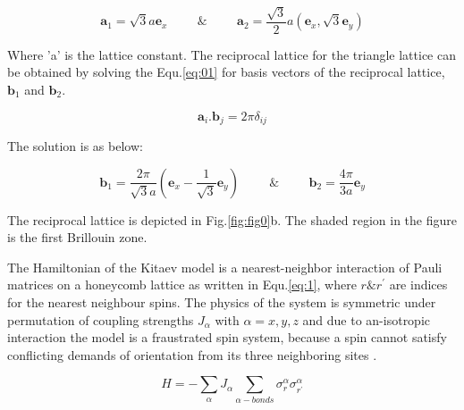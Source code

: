 \documentclass{article}
\begin{document}
\begin{equation}\label{eq:0}
    \textbf{a}_1 = \sqrt{3} a \textbf{e}_x \hspace{1cm} \& \hspace{1cm}
    \textbf{a}_2 = \frac{\sqrt{3}}{2} a (\textbf{e}_x, \sqrt{3}\textbf{e}_y)
\end{equation}

Where 'a' is the lattice constant. The reciprocal lattice for the triangle lattice can be obtained by solving the Equ.\hspace{0.2mm}\ref{eq:01} for basis vectors of the reciprocal lattice, $\textbf{b}_1$ and $\textbf{b}_2$.

\begin{equation}\label{eq:01}
    \textbf{a}_i.\textbf{b}_j = 2\pi\delta_{ij}
\end{equation}

The solution is as below:

\begin{equation}\label{eq:02}
    \textbf{b}_1 = \frac{2\pi}{\sqrt{3}a} (\textbf{e}_x-\frac{1}{\sqrt{3}}\textbf{e}_y) \hspace{1cm} \& \hspace{1cm}
    \textbf{b}_2 = \frac{4\pi}{3a} \textbf{e}_y
\end{equation}

The reciprocal lattice is depicted in Fig.\hspace{0.2mm}\ref{fig:fig0}b. The shaded region in the figure is the first Brillouin zone.

The Hamiltonian of the Kitaev model is a nearest-neighbor interaction of Pauli matrices on a honeycomb lattice as written in Equ.\hspace{0.2mm}\ref{eq:1}, where $r \& r^{'}$ are indices for the nearest neighbour spins. The physics of the system is symmetric under permutation of coupling strengths $J_{\alpha}$ with $\alpha = x, y, z$ and due to an-isotropic interaction the model is a fraustrated spin system, because a spin cannot satisfy conflicting
 demands of orientation from its three neighboring sites \cite{kita}.

\begin{equation}\label{eq:1}
    H = - \sum_{\alpha} J_{\alpha} \sum_{\alpha-bonds} \sigma^{\alpha}_{r}\sigma^{\alpha}_{r^{'}}
\end{equation}
\end{document}
